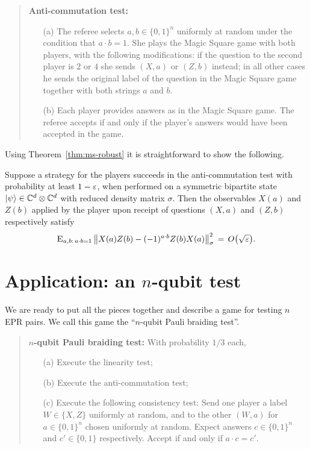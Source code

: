 \begin{quote}
\textbf{Anti-commutation test:}
\begin{itemize}
\item[(a)] The referee selects $a,b\in\{0,1\}^n$ uniformly at random under the condition that $a\cdot b=1$. She plays the Magic Square game with both players, with the following modifications: if the question to the second player is $2$ or $4$ she sends $(X,a)$ or $(Z,b)$ instead; in all other cases he sends the original label of the question in the Magic Square game together with both strings $a$ and $b$. 
\item[(b)] Each player provides answers as in the Magic Square game. The referee accepts if and only if the player's answers would have been accepted in the game. 
\end{itemize}
\end{quote}

Using Theorem~\ref{thm:ms-robust} it is straightforward to show the following. 

\begin{lemma}\label{lem:ac}
Suppose a strategy for the players succeeds in the anti-commutation test with probability at least $1-\varepsilon$, when performed on a symmetric bipartite state $|\psi\rangle \in \mathbb{C}^d \otimes \mathbb{C}^d$ with reduced density matrix $\sigma$. Then the observables $X(a)$ and $Z(b)$ applied by the player upon receipt of questions $(X,a)$ and $(Z,b)$ respectively satisfy 
\begin{equation}\label{eq:ac}
 \textsc{E}_{a,b:\,a\cdot b=1} \,\big\| X(a)Z(b)-(-1)^{a\cdot b} Z(b)X(a)\big\|_\sigma^2\,=\,O\big(\sqrt{\varepsilon}\big).
\end{equation}
\end{lemma}

\section{Application: an $n$-qubit test}
\label{sec:th101}

We are ready to put all the pieces together and describe a game for testing $n$ EPR pairs. We call this game the ``$n$-qubit Pauli braiding test''. 

\begin{quote}
\textbf{$n$-qubit Pauli braiding test:}
With probability $1/3$ each, 
\begin{itemize}
\item[(a)] Execute the linearity test;
\item[(b)] Execute the anti-commutation test;
\item[(c)] Execute the following consistency test: Send one player a label $W\in\{X,Z\}$ uniformly at random, and to the other $(W,a)$ for $a\in\{0,1\}^n$ chosen uniformly at random. Expect answers $c \in \{0,1\}^n$ and $c'\in\{0,1\}$ respectively. Accept if and only if $a\cdot c = c'$. 
\end{itemize}
\end{quote}

